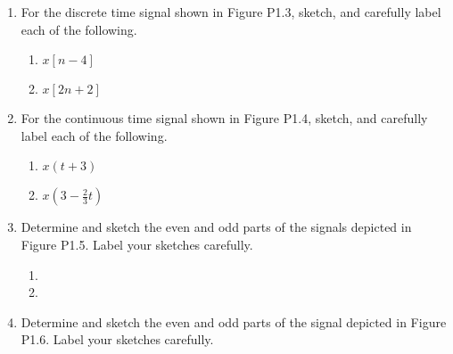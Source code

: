 \begin{enumerate}
\begin{enumerate}
      \item $x_2(t)=\left\{\begin{array}{l r} 2+2\cos(t),\, & 0<t< 2\pi\\ 0,\, & \text{Otherwise}\end{array}$

        \item $x_3[n]=\left\{\begin{array}{l r} (.5)^n,\, & n\geq0\\ 0,\, & \text{Otherwise}\end{array}$

    \end{enumerate}

  \item For the discrete time signal shown in Figure P1.3, sketch, and carefully label each of the following.

    \begin{enumerate}

      \item $x[n-4]$

      \item $x[2n+2]$

    \end{enumerate}

  \item For the continuous time signal shown in Figure P1.4, sketch, and carefully label each of the following.

    \begin{enumerate}

      \item $x(t+3)$

      \item $x\left( 3-\frac{2}{3}t \right)$

    \end{enumerate}

  \item Determine and sketch the even and odd parts of the signals depicted in Figure P1.5. Label your sketches carefully.

    \begin{enumerate}

      \item 

      \item 

    \end{enumerate}

  \item Determine and sketch the even and odd parts of the signal depicted in Figure P1.6. Label your sketches carefully.


\end{enumerate}
